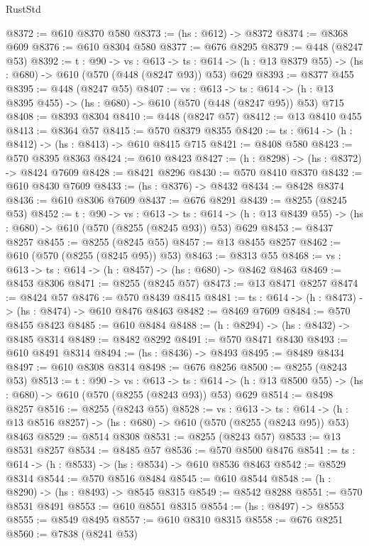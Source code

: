 \begin{lexlean}{RustStd}
\begin{coremodule}
@8372 := @610 @8370 @580
@8373 := (hs : @612) -> @8372
@8374 := @8368 @609
@8376 := @610 @8304 @580
@8377 := @676 @8295
@8379 := @448 (@8247 @53)
@8392 := {t : @90} ->
  {vs : @613} ->
  {ts : @614} -> (h : @13 @8379 @55) -> (hs : @680) -> @610 (@570 (@448 (@8247 @93)) @53) @629
@8393 := @8377 @455
@8395 := @448 (@8247 @55)
@8407 := {vs : @613} ->
  {ts : @614} -> (h : @13 @8395 @455) -> (hs : @680) -> @610 (@570 (@448 (@8247 @95)) @53) @715
@8408 := @8393 @8304
@8410 := @448 (@8247 @57)
@8412 := @13 @8410 @455
@8413 := @8364 @57
@8415 := @570 @8379 @8355
@8420 := {ts : @614} -> (h : @8412) -> (hs : @8413) -> @610 @8415 @715
@8421 := @8408 @580
@8423 := @570 @8395 @8363
@8424 := @610 @8423
@8427 := (h : @8298) -> (hs : @8372) -> @8424 @7609
@8428 := @8421 @8296
@8430 := @570 @8410 @8370
@8432 := @610 @8430 @7609
@8433 := (hs : @8376) -> @8432
@8434 := @8428 @8374
@8436 := @610 @8306 @7609
@8437 := @676 @8291
@8439 := @8255 (@8245 @53)
@8452 := {t : @90} ->
  {vs : @613} ->
  {ts : @614} -> (h : @13 @8439 @55) -> (hs : @680) -> @610 (@570 (@8255 (@8245 @93)) @53) @629
@8453 := @8437 @8257
@8455 := @8255 (@8245 @55)
@8457 := @13 @8455 @8257
@8462 := @610 (@570 (@8255 (@8245 @95)) @53)
@8463 := @8313 @55
@8468 := {vs : @613} -> {ts : @614} -> (h : @8457) -> (hs : @680) -> @8462 @8463
@8469 := @8453 @8306
@8471 := @8255 (@8245 @57)
@8473 := @13 @8471 @8257
@8474 := @8424 @57
@8476 := @570 @8439 @8415
@8481 := {ts : @614} -> (h : @8473) -> (hs : @8474) -> @610 @8476 @8463
@8482 := @8469 @7609
@8484 := @570 @8455 @8423
@8485 := @610 @8484
@8488 := (h : @8294) -> (hs : @8432) -> @8485 @8314
@8489 := @8482 @8292
@8491 := @570 @8471 @8430
@8493 := @610 @8491 @8314
@8494 := (hs : @8436) -> @8493
@8495 := @8489 @8434
@8497 := @610 @8308 @8314
@8498 := @676 @8256
@8500 := @8255 (@8243 @53)
@8513 := {t : @90} ->
  {vs : @613} ->
  {ts : @614} -> (h : @13 @8500 @55) -> (hs : @680) -> @610 (@570 (@8255 (@8243 @93)) @53) @629
@8514 := @8498 @8257
@8516 := @8255 (@8243 @55)
@8528 := {vs : @613} ->
  {ts : @614} -> (h : @13 @8516 @8257) -> (hs : @680) -> @610 (@570 (@8255 (@8243 @95)) @53) @8463
@8529 := @8514 @8308
@8531 := @8255 (@8243 @57)
@8533 := @13 @8531 @8257
@8534 := @8485 @57
@8536 := @570 @8500 @8476
@8541 := {ts : @614} -> (h : @8533) -> (hs : @8534) -> @610 @8536 @8463
@8542 := @8529 @8314
@8544 := @570 @8516 @8484
@8545 := @610 @8544
@8548 := (h : @8290) -> (hs : @8493) -> @8545 @8315
@8549 := @8542 @8288
@8551 := @570 @8531 @8491
@8553 := @610 @8551 @8315
@8554 := (hs : @8497) -> @8553
@8555 := @8549 @8495
@8557 := @610 @8310 @8315
@8558 := @676 @8251
@8560 := @7838 (@8241 @53)

\end{coremodule}
\end{lexlean}
